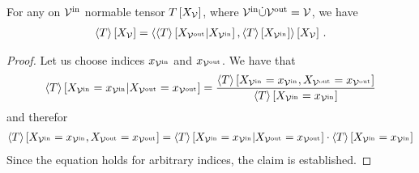 \begin{theorem}\label{the:normationContractionEQ}
	For any on $\mathcal{V}^{\mathrm{in}}$ normable tensor $T\left[X_{\mathcal{V}}\right]$, where $\mathcal{V}^{\mathrm{in}}\dot{\cup}\mathcal{V}^{\mathrm{out}}=\mathcal{V}$, we have
	\begin{align*}
		\left\langle T\right\rangle \left[ X_{\mathcal{V}} \right]
		= \left\langle \left\langle T\right\rangle \left[ X_{\mathcal{V}^{\mathrm{out}}} | X_{\mathcal{V}^{\mathrm{in}}} \right],\left\langle T\right\rangle \left[ X_{\mathcal{V}^{\mathrm{in}}} \right]\right\rangle \left[ X_{\mathcal{V}} \right] \, .
	\end{align*}
\end{theorem}
\begin{proof}
	Let us choose indices $x_{\mathcal{V}^{\mathrm{in}}}$ and $x_{\mathcal{V}^{\mathrm{out}}}$.
	We have that
	\begin{align*}
		\left\langle T\right\rangle \left[ X_{\mathcal{V}^{\mathrm{in}}}=x_{\mathcal{V}^{\mathrm{in}}} | X_{\mathcal{V}^{\mathrm{out}}}=x_{\mathcal{V}^{\mathrm{out}}} \right]
		= \frac{
			\left\langle T\right\rangle \left[ X_{\mathcal{V}^{\mathrm{in}}}=x_{\mathcal{V}^{\mathrm{in}}},X_{\mathcal{V}^{\mathrm{out}}}=x_{\mathcal{V}^{\mathrm{out}}} \right]
		}{
			\left\langle T\right\rangle \left[ X_{\mathcal{V}^{\mathrm{in}}}=x_{\mathcal{V}^{\mathrm{in}}} \right]
		}
	\end{align*}
	and therefor
	\begin{align*}
		\left\langle T\right\rangle \left[ X_{\mathcal{V}^{\mathrm{in}}}=x_{\mathcal{V}^{\mathrm{in}}},X_{\mathcal{V}^{\mathrm{out}}}=x_{\mathcal{V}^{\mathrm{out}}} \right] =
		\left\langle T\right\rangle \left[ X_{\mathcal{V}^{\mathrm{in}}}=x_{\mathcal{V}^{\mathrm{in}}} | X_{\mathcal{V}^{\mathrm{out}}}=x_{\mathcal{V}^{\mathrm{out}}} \right]
		\cdot
		\left\langle T\right\rangle \left[ X_{\mathcal{V}^{\mathrm{in}}}=x_{\mathcal{V}^{\mathrm{in}}} \right]
	\end{align*}
	Since the equation holds for arbitrary indices, the claim is established.
\end{proof}


